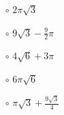 \begin{itemize}
  \item[\Huge\(\circ\)] \(2\pi\sqrt3\)
  \item[\Huge\(\circ\)] \(9\sqrt3-\frac{9}{2}\pi\)
  \item[\Huge\(\circ\)] \(4\sqrt6+3\pi\)
  \item[\Huge\(\circ\)] \(6\pi\sqrt6\)
  \item[\Huge\(\circ\)] \(\pi\sqrt3+\frac{9\sqrt3}{4}\)
\end{itemize}
